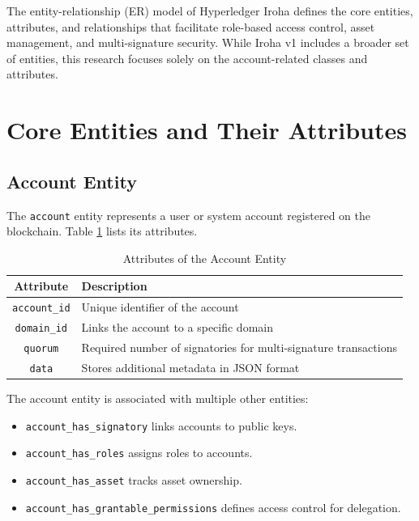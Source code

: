 \documentclass{article}
\begin{document}
The entity-relationship (ER) model of Hyperledger Iroha defines the core entities, attributes, and relationships that facilitate role-based access control, asset management, and multi-signature security. While Iroha v1 includes a broader set of entities, this research focuses solely on the account-related classes and attributes.

\section{Core Entities and Their Attributes}
\subsection{Account Entity}
The \texttt{account} entity represents a user or system account registered on the blockchain. Table \ref{tab:account_attributes} lists its attributes.

\begin{table}[h]
      \centering
      \caption{Attributes of the Account Entity}
      \label{tab:account_attributes}
      \begin{tabular}{|c|l|}
            \hline
            \textbf{Attribute}   & \textbf{Description}                                            \\ \hline
            \texttt{account\_id} & Unique identifier of the account                                \\ \hline
            \texttt{domain\_id}  & Links the account to a specific domain                          \\ \hline
            \texttt{quorum}      & Required number of signatories for multi-signature transactions \\ \hline
            \texttt{data}        & Stores additional metadata in JSON format                       \\ \hline
      \end{tabular}
\end{table}

The account entity is associated with multiple other entities:
\begin{itemize}
      \item \texttt{account\_has\_signatory} links accounts to public keys.
      \item \texttt{account\_has\_roles} assigns roles to accounts.
      \item \texttt{account\_has\_asset} tracks asset ownership.
      \item \texttt{account\_has\_grantable\_permissions} defines access control for delegation.
\end{itemize}
\end{document}

